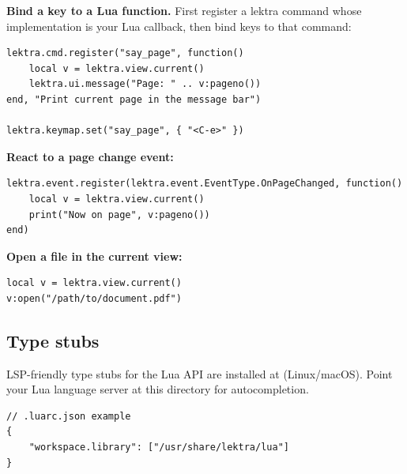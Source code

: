 \documentclass[a4paper,12pt]{article}
\newcommand{\pathtt}[1]{{\ttfamily\seqsplit{#1}}}
\begin{document}
\textbf{Bind a key to a Lua function.} First register a lektra command whose implementation is your Lua callback, then bind keys to that command:

\begin{tcolorbox}[colback=gray!5, colframe=gray!40, boxrule=0.4pt, arc=4pt,
    fontupper=\ttfamily\small]
\begin{verbatim}
lektra.cmd.register("say_page", function()
    local v = lektra.view.current()
    lektra.ui.message("Page: " .. v:pageno())
end, "Print current page in the message bar")

lektra.keymap.set("say_page", { "<C-e>" })
\end{verbatim}
\end{tcolorbox}

\textbf{React to a page change event:}

\begin{tcolorbox}[colback=gray!5, colframe=gray!40, boxrule=0.4pt, arc=4pt,
    fontupper=\ttfamily\small]
\begin{verbatim}
lektra.event.register(lektra.event.EventType.OnPageChanged, function()
    local v = lektra.view.current()
    print("Now on page", v:pageno())
end)
\end{verbatim}
\end{tcolorbox}

\textbf{Open a file in the current view:}

\begin{tcolorbox}[colback=gray!5, colframe=gray!40, boxrule=0.4pt, arc=4pt,
    fontupper=\ttfamily\small]
\begin{verbatim}
local v = lektra.view.current()
v:open("/path/to/document.pdf")
\end{verbatim}
\end{tcolorbox}

\subsection{Type stubs}

LSP-friendly type stubs for the Lua API are installed at
\pathtt{\$prefix/share/lektra/lua/} (Linux/macOS). Point your Lua language server at this directory for autocompletion.

\begin{tcolorbox}[colback=gray!5, colframe=gray!40, boxrule=0.4pt, arc=4pt,
    fontupper=\ttfamily\small]
\begin{verbatim}
// .luarc.json example
{
    "workspace.library": ["/usr/share/lektra/lua"]
}
\end{verbatim}
\end{tcolorbox}
\end{document}
